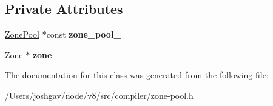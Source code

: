\subsection*{Private Attributes}
\begin{DoxyCompactItemize}
\item 
\hyperlink{classv8_1_1internal_1_1compiler_1_1_zone_pool}{Zone\+Pool} $\ast$const {\bfseries zone\+\_\+pool\+\_\+}\hypertarget{classv8_1_1internal_1_1compiler_1_1_zone_pool_1_1_scope_a73f3798690609e14cafa9c8140ea394d}{}\label{classv8_1_1internal_1_1compiler_1_1_zone_pool_1_1_scope_a73f3798690609e14cafa9c8140ea394d}

\item 
\hyperlink{classv8_1_1internal_1_1_zone}{Zone} $\ast$ {\bfseries zone\+\_\+}\hypertarget{classv8_1_1internal_1_1compiler_1_1_zone_pool_1_1_scope_a42c91398ac4b83ba1191e7ce5f87eb46}{}\label{classv8_1_1internal_1_1compiler_1_1_zone_pool_1_1_scope_a42c91398ac4b83ba1191e7ce5f87eb46}

\end{DoxyCompactItemize}


The documentation for this class was generated from the following file\+:\begin{DoxyCompactItemize}
\item 
/\+Users/joshgav/node/v8/src/compiler/zone-\/pool.\+h\end{DoxyCompactItemize}
